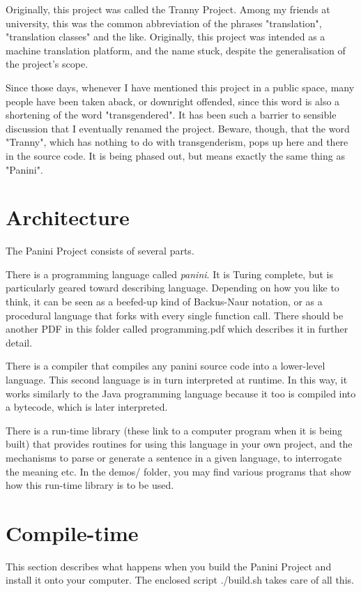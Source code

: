 \documentclass{article}
\begin{document}
Originally, this project was called the Tranny Project. Among my friends at
university, this was the common abbreviation of the phrases "translation",
"translation classes" and the like. Originally, this project was intended as a
machine translation platform, and the name stuck, despite the generalisation of
the project's scope. 

Since those days, whenever I have mentioned this project in a public space, many
people have been taken aback, or downright offended, since this word is also a
shortening of the word "transgendered". It has been such a barrier to sensible
discussion that I eventually renamed the project. Beware, though, that the word
"Tranny", which has nothing to do with transgenderism, pops up here and there in
the source code. It is being phased out, but means exactly the same thing as
"Panini".

\section{Architecture}
The Panini Project consists of several parts.

There is a programming language called \emph{panini}. It is Turing complete, but
is particularly geared toward describing language. Depending on how you like to
think, it can be seen as a beefed-up kind of Backus-Naur notation, or as a
procedural language that forks with every single function call. There should be
another PDF in this folder called programming.pdf which describes it in further
detail.

There is a compiler that compiles any panini source code into a lower-level
language. This second language is in turn interpreted at runtime. In this way,
it works similarly to the Java programming language because it too is compiled
into a bytecode, which is later interpreted.

There is a run-time library (these link to a computer program when it is being
built) that provides routines for using this language in your own project, and
the mechanisms to parse or generate a sentence in a given language, to
interrogate the meaning etc. In the demos/ folder, you may find various programs
that show how this run-time library is to be used.

\section{Compile-time}
This section describes what happens when you build the Panini Project and
install it onto your computer. The enclosed script ./build.sh takes care of all
this.
\end{document}
